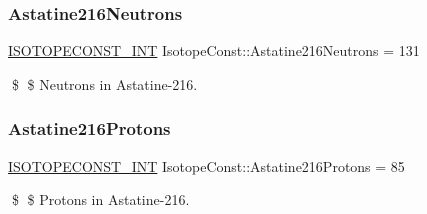 \subsubsection{\texorpdfstring{Astatine216\+Neutrons}{Astatine216Neutrons}}
{\footnotesize\ttfamily \mbox{\hyperlink{group___isotope_const-_macros_ga5f18360b3e99483a35c32d789e62621c}{I\+S\+O\+T\+O\+P\+E\+C\+O\+N\+S\+T\+\_\+\+I\+NT}} Isotope\+Const\+::\+Astatine216\+Neutrons = 131}

\$ \$ Neutrons in Astatine-\/216. \mbox{\label{group___isotope_const-_astatine-_at216_ga2532771611c50f3e9d230fc4a3d2513c}} 
\subsubsection{\texorpdfstring{Astatine216\+Protons}{Astatine216Protons}}
{\footnotesize\ttfamily \mbox{\hyperlink{group___isotope_const-_macros_ga5f18360b3e99483a35c32d789e62621c}{I\+S\+O\+T\+O\+P\+E\+C\+O\+N\+S\+T\+\_\+\+I\+NT}} Isotope\+Const\+::\+Astatine216\+Protons = 85}

\$ \$ Protons in Astatine-\/216. 